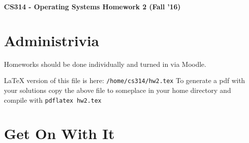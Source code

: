 \documentclass[12pt]{article}
\begin{document}
\begin{center}
{\bf CS314 - Operating Systems Homework 2 (Fall '16)
}
\end{center}

\setlength{\unitlength}{1in}
\section{Administrivia}
Homeworks should be done individually and turned in via Moodle. 

LaTeX version of this file is here: \verb#/home/cs314/hw2.tex# To
generate a pdf with your solutions copy the above file to someplace in your home directory and compile with
\verb#pdflatex hw2.tex#

\section{Get On With It}
\end{document}

